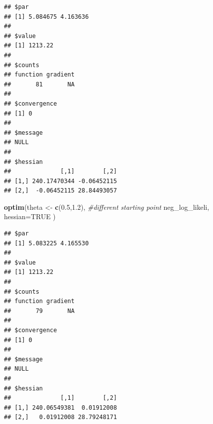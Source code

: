 \documentclass[11pt,]{article}
\newenvironment{Shaded}{\begin{snugshade}}{\end{snugshade}}
\newcommand{\KeywordTok}[1]{\textcolor[rgb]{0.13,0.29,0.53}{\textbf{#1}}}
\newcommand{\DataTypeTok}[1]{\textcolor[rgb]{0.13,0.29,0.53}{#1}}
\newcommand{\DecValTok}[1]{\textcolor[rgb]{0.00,0.00,0.81}{#1}}
\newcommand{\FloatTok}[1]{\textcolor[rgb]{0.00,0.00,0.81}{#1}}
\newcommand{\StringTok}[1]{\textcolor[rgb]{0.31,0.60,0.02}{#1}}
\newcommand{\CommentTok}[1]{\textcolor[rgb]{0.56,0.35,0.01}{\textit{#1}}}
\newcommand{\OtherTok}[1]{\textcolor[rgb]{0.56,0.35,0.01}{#1}}
\newcommand{\ControlFlowTok}[1]{\textcolor[rgb]{0.13,0.29,0.53}{\textbf{#1}}}
\newcommand{\OperatorTok}[1]{\textcolor[rgb]{0.81,0.36,0.00}{\textbf{#1}}}
\newcommand{\NormalTok}[1]{#1}
\begin{document}
\begin{Shaded}
\end{Shaded}

\begin{verbatim}
## $par
## [1] 5.084675 4.163636
## 
## $value
## [1] 1213.22
## 
## $counts
## function gradient 
##       81       NA 
## 
## $convergence
## [1] 0
## 
## $message
## NULL
## 
## $hessian
##              [,1]        [,2]
## [1,] 240.17470344 -0.06452115
## [2,]  -0.06452115 28.84493057
\end{verbatim}

\begin{Shaded}
\begin{Highlighting}[]
\KeywordTok{optim}\NormalTok{(theta <-}\StringTok{ }\KeywordTok{c}\NormalTok{(}\FloatTok{0.5}\NormalTok{,}\FloatTok{1.2}\NormalTok{), }\CommentTok{#different starting point}
\NormalTok{      neg_log_likeli, }
      \DataTypeTok{hessian=}\OtherTok{TRUE}
\NormalTok{      ) }
\end{Highlighting}
\end{Shaded}

\begin{verbatim}
## $par
## [1] 5.083225 4.165530
## 
## $value
## [1] 1213.22
## 
## $counts
## function gradient 
##       79       NA 
## 
## $convergence
## [1] 0
## 
## $message
## NULL
## 
## $hessian
##              [,1]        [,2]
## [1,] 240.06549381  0.01912008
## [2,]   0.01912008 28.79248171
\end{verbatim}
\end{document}
